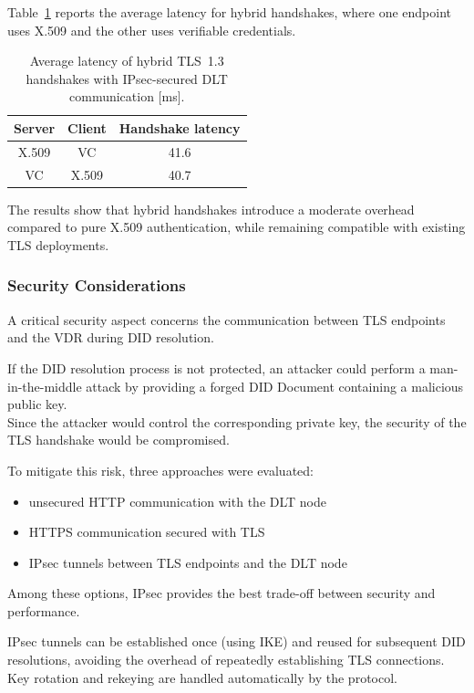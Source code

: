 \noindent
Table~\ref{tab:hybrid_latency} reports the average latency for hybrid handshakes, where one endpoint uses X.509 and the other uses verifiable credentials.

\begin{table}[h]
\centering
\caption{Average latency of hybrid TLS~1.3 handshakes with IPsec-secured DLT communication [ms].}
\label{tab:hybrid_latency}
\begin{tabular}{c|c|c}
\hline
Server & Client & Handshake latency \\ \hline
X.509 & VC & 41.6 \\
VC & X.509 & 40.7 \\ \hline
\end{tabular}
\end{table}

\noindent
The results show that hybrid handshakes introduce a moderate overhead compared to pure X.509 authentication, while remaining compatible with existing TLS deployments.

\subsubsection*{Security Considerations}

\noindent
A critical security aspect concerns the communication between TLS endpoints and the VDR during DID resolution.
\medskip

\noindent
If the DID resolution process is not protected, an attacker could perform a man-in-the-middle attack by providing a forged DID Document containing a malicious public key.\\  
Since the attacker would control the corresponding private key, the security of the TLS handshake would be compromised.
\medskip

\noindent
To mitigate this risk, three approaches were evaluated:
\begin{itemize}
    \item unsecured HTTP communication with the DLT node
    \item HTTPS communication secured with TLS
    \item IPsec tunnels between TLS endpoints and the DLT node
\end{itemize}

\noindent
Among these options, IPsec provides the best trade-off between security and performance.
\medskip

\noindent
IPsec tunnels can be established once (using IKE) and reused for subsequent DID resolutions, avoiding the overhead of repeatedly establishing TLS connections.\\ 
Key rotation and rekeying are handled automatically by the protocol.
\medskip

